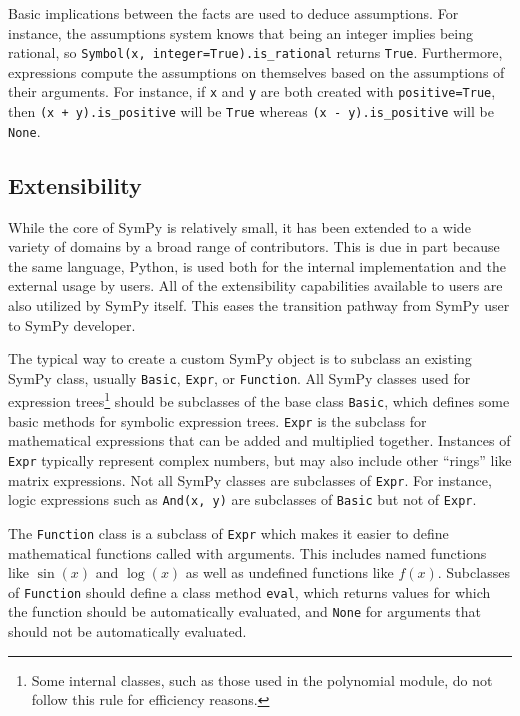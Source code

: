 Basic implications between the facts are used to deduce assumptions. For
instance, the assumptions system knows that being an integer implies being
rational, so \texttt{Symbol(\textquotesingle{}x\textquotesingle{}, integer=True).is\_rational} returns
\texttt{True}. Furthermore, expressions compute the assumptions on themselves
based on the assumptions of their arguments. For instance, if \texttt{x} and
\texttt{y} are both created with \texttt{positive=True}, then
\texttt{(x + y).is\_positive} will be \texttt{True} whereas
\texttt{(x - y).is\_positive} will be \texttt{None}.


\subsection{Extensibility}

While the core of SymPy is relatively small, it has been extended to a wide variety
of domains by a broad range of contributors.  This is due in part because the
same language, Python, is used both for the internal implementation and the
external usage by users.  All of the extensibility capabilities available to
users are also utilized by SymPy itself. This eases the transition pathway from
SymPy user to SymPy developer.

The typical way to create a custom SymPy object is to subclass an existing
SymPy class, usually  \texttt{Basic}, \texttt{Expr}, or
\texttt{Function}. All SymPy classes used for expression trees\footnote{Some
  internal classes, such as those used in the polynomial module, do not follow
  this rule for efficiency reasons.} should be subclasses of the base class
\texttt{Basic}, which defines some basic methods for symbolic expression
trees. \texttt{Expr} is the subclass for mathematical expressions that can be
added and multiplied together. Instances of \texttt{Expr} typically represent
complex numbers, but may also include other ``rings'' like matrix expressions.
Not all SymPy classes are subclasses of \texttt{Expr}. For instance, logic expressions such
as \verb|And(x, y)| are subclasses of \texttt{Basic} but not of \texttt{Expr}.

The \texttt{Function} class is a subclass of \texttt{Expr} which makes it
easier to define mathematical functions called with arguments. This includes
named functions like $\sin(x)$ and $\log(x)$ as well as undefined functions
like $f(x)$. Subclasses of \texttt{Function} should define a
class method \texttt{eval}, which returns values for which the function should
be automatically evaluated, and \texttt{None} for arguments that should not be
automatically evaluated.

